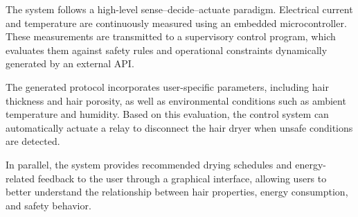 \documentclass[11pt,a4paper]{article}
\begin{document}
The system follows a high-level sense--decide--actuate paradigm. Electrical current and temperature are continuously measured using an embedded microcontroller. These measurements are transmitted to a supervisory control program, which evaluates them against safety rules and operational constraints dynamically generated by an external API.

The generated protocol incorporates user-specific parameters, including hair thickness and hair porosity, as well as environmental conditions such as ambient temperature and humidity. Based on this evaluation, the control system can automatically actuate a relay to disconnect the hair dryer when unsafe conditions are detected.

In parallel, the system provides recommended drying schedules and energy-related feedback to the user through a graphical interface, allowing users to better understand the relationship between hair properties, energy consumption, and safety behavior.
\end{document}
